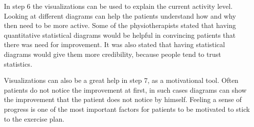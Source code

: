 In step 6 the visualizations can be used to explain the current activity level. Looking at different diagrams can help the patients understand how and why then need to be more active. Some of the physiotherapists stated that having quantitative statistical diagrams would be helpful in convincing patients that there was need for improvement. It was also stated that having statistical diagrams would give them more credibility, because people tend to trust statistics. 

Visualizations can also be a great help in step 7, as a motivational tool. Often patients do not notice the improvement at first, in such cases diagrams can show the improvement that the patient does not notice by himself. Feeling a sense of progress is one of the most important factors for patients to be motivated to stick to the exercise plan.
